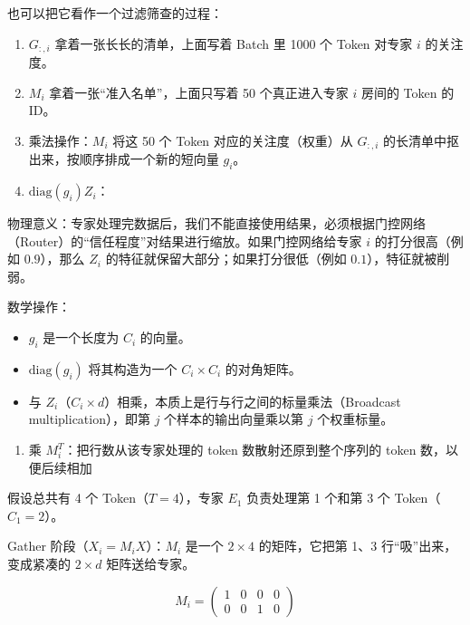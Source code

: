 也可以把它看作一个过滤筛查的过程：

\begin{enumerate}
\def\labelenumi{\arabic{enumi}.}
\item
  \(G_{:,i}\) 拿着一张长长的清单，上面写着 Batch 里 1000 个 Token 对专家 \(i\) 的关注度。
\item
  \(M_i\) 拿着一张``准入名单''，上面只写着 50 个真正进入专家 \(i\) 房间的 Token 的 ID。
\item
  乘法操作：\(M_i\) 将这 50 个 Token 对应的关注度（权重）从 \(G_{:,i}\) 的长清单中抠出来，按顺序排成一个新的短向量 \(g_i\)。
\item
{}
  \(\mathrm{diag}(g_i)Z_i\)：
\end{enumerate}

物理意义：专家处理完数据后，我们不能直接使用结果，必须根据门控网络（Router）的``信任程度''对结果进行缩放。如果门控网络给专家 \(i\) 的打分很高（例如 \(0.9\)），那么 \(Z_i\) 的特征就保留大部分；如果打分很低（例如 \(0.1\)），特征就被削弱。

数学操作：

\begin{itemize}
\tightlist
\item
  \(g_i\) 是一个长度为 \(C_i\) 的向量。
\item
  \(\mathrm{diag}(g_i)\) 将其构造为一个 \(C_i \times C_i\) 的对角矩阵。
\item
  与 \(Z_i\)（\(C_i \times d\)）相乘，本质上是行与行之间的标量乘法（Broadcast multiplication），即第 \(j\) 个样本的输出向量乘以第 \(j\) 个权重标量。
\end{itemize}

\begin{enumerate}
\def\labelenumi{\arabic{enumi}.}
\setcounter{enumi}{2}
\tightlist
\item
  乘 \(M_i^T\)：把行数从该专家处理的 token 数散射还原到整个序列的 token 数，以便后续相加
\end{enumerate}

假设总共有 4 个 Token（\(T=4\)），专家 \(E_1\) 负责处理第 1 个和第 3 个 Token（\(C_1=2\)）。

Gather 阶段（\(X_i=M_iX\)）：\(M_i\) 是一个 \(2 \times 4\) 的矩阵，它把第 1、3 行``吸''出来，变成紧凑的 \(2 \times d\) 矩阵送给专家。

\[
M_i =
\begin{pmatrix}
1 & 0 & 0 & 0 \\
0 & 0 & 1 & 0
\end{pmatrix}
\]

